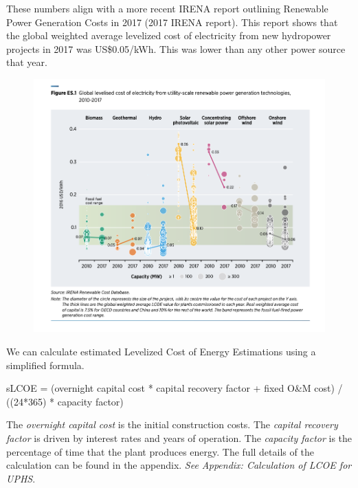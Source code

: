 \documentclass[hidelinks,12pt,a4paper]{article}
\begin{document}
These numbers align with a more recent IRENA report outlining Renewable Power Generation Costs in 2017 (2017 IRENA report). This report shows that the global weighted average levelized cost of electricity from new hydropower projects in 2017 was US\$0.05/kWh. This was lower than any other power source that year. \cite{RenewablePowerGenerationCostsIn2017}

\begin{figure}[ht!]
    \centering
    \includegraphics[width=1\textwidth]{renewable-power-generation-costs-in-2017.png}
    \caption{\cite{RenewablePowerGenerationCostsIn2017}}
\end{figure}
\FloatBarrier

We can calculate estimated Levelized Cost of Energy Estimations using a simplified formula. \cite{SimpleLevelizedCostOfEnergyCalculator}

\begin{displayquote}
sLCOE = (overnight capital cost * capital recovery factor + fixed O\&M cost) / ((24*365) * capacity factor)
\end{displayquote}

The \textit{overnight capital cost} is the initial construction costs. The \textit{capital recovery factor} is driven by interest rates and years of operation. The \textit{capacity factor} is the percentage of time that the plant produces energy. The full details of the calculation can be found in the appendix. \textit{See Appendix: Calculation of LCOE for UPHS}.
\end{document}

